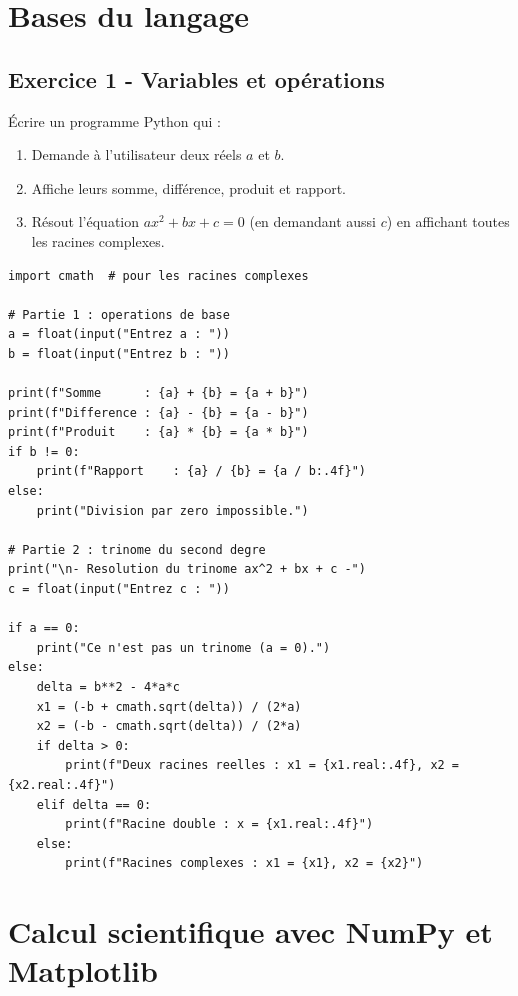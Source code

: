 \documentclass[12pt,a4paper]{article}
\begin{document}
\newpage
\section{Bases du langage}

\subsection*{Exercice 1 - Variables et opérations \niveau{\facile}}

\begin{boiteexercice}
Écrire un programme Python qui :
\begin{enumerate}
  \item Demande à l'utilisateur deux réels $a$ et $b$.
  \item Affiche leurs somme, différence, produit et rapport.
  \item Résout l'équation $ax^2 + bx + c = 0$ (en demandant aussi $c$) en affichant toutes les racines complexes.
\end{enumerate}
\end{boiteexercice}

\begin{boitecorrige}
\begin{lstlisting}
import cmath  # pour les racines complexes

# Partie 1 : operations de base
a = float(input("Entrez a : "))
b = float(input("Entrez b : "))

print(f"Somme      : {a} + {b} = {a + b}")
print(f"Difference : {a} - {b} = {a - b}")
print(f"Produit    : {a} * {b} = {a * b}")
if b != 0:
    print(f"Rapport    : {a} / {b} = {a / b:.4f}")
else:
    print("Division par zero impossible.")

# Partie 2 : trinome du second degre
print("\n- Resolution du trinome ax^2 + bx + c -")
c = float(input("Entrez c : "))

if a == 0:
    print("Ce n'est pas un trinome (a = 0).")
else:
    delta = b**2 - 4*a*c
    x1 = (-b + cmath.sqrt(delta)) / (2*a)
    x2 = (-b - cmath.sqrt(delta)) / (2*a)
    if delta > 0:
        print(f"Deux racines reelles : x1 = {x1.real:.4f}, x2 = {x2.real:.4f}")
    elif delta == 0:
        print(f"Racine double : x = {x1.real:.4f}")
    else:
        print(f"Racines complexes : x1 = {x1}, x2 = {x2}")
\end{lstlisting}
\end{boitecorrige}

\section{Calcul scientifique avec NumPy et Matplotlib}
\end{document}
